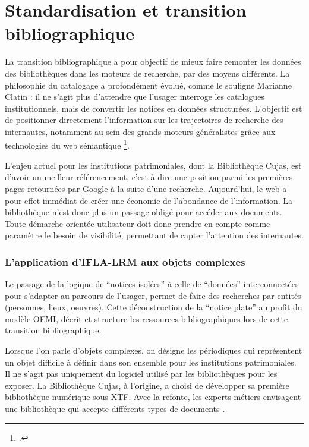 \section{Standardisation et transition bibliographique}
La transition bibliographique a pour objectif de mieux faire remonter les données des bibliothèques dans les moteurs de recherche, par des moyens différents. La philosophie du catalogage a profondément évolué, comme le souligne Marianne Clatin : il ne s'agit plus d'attendre que l'usager interroge les catalogues institutionnels, mais de convertir les notices en données structurées. L'objectif est de positionner directement l'information sur les trajectoires de recherche des internautes, notamment au sein des grands moteurs généralistes grâce aux technologies du web sémantique \footcite{bellierCollaborationOrganisationLimpact2016}.

L'enjeu actuel pour les institutions patrimoniales, dont la Bibliothèque Cujas, est d'avoir un meilleur référencement, c'est-à-dire une position parmi les premières pages retournées par Google à la suite d'une recherche. Aujourd'hui, le web a pour effet immédiat de créer une économie de l'abondance de l'information. La bibliothèque n'est donc plus un passage obligé pour accéder aux documents. Toute démarche orientée utilisateur doit donc prendre en compte comme paramètre le besoin de visibilité, permettant de capter l'attention des internautes.

\subsubsection{L'application d'IFLA-LRM aux objets complexes}
Le passage de la logique de \enquote{notices isolées} à celle de \enquote{données} interconnectées pour s'adapter au parcours de l'usager, permet de faire des recherches par entités (personnes, lieux, oeuvres). Cette déconstruction de la \enquote{notice plate} au profit du modèle \ac{OEMI}, décrit et structure les ressources bibliographiques lors de cette transition bibliographique. 

Lorsque l'on parle d'objets complexes, on désigne les périodiques qui représentent un objet difficile à définir dans son ensemble pour les institutions patrimoniales. Il ne s'agit pas uniquement du logiciel utilisé par les bibliothèques pour les exposer. La Bibliothèque Cujas, à l'origine, a choisi de développer sa première bibliothèque numérique sous \ac{XTF}. Avec la refonte, les experts métiers envisagent une bibliothèque qui accepte différents types de documents . 

